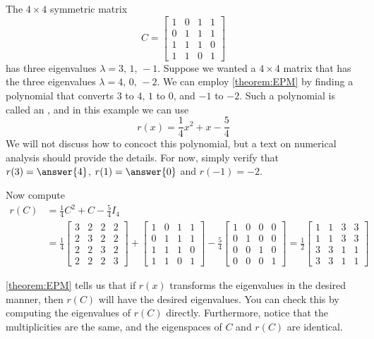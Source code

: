 \documentclass{ximera}
\begin{document}
\begin{example}

The $4\times 4$ symmetric matrix
\[
C=
\begin{bmatrix}
1 &  0 &  1 &  1\\
0 &  1 &  1 &  1\\
1 &  1 &  1 &  0\\
1 &  1 &  0 &  1
\end{bmatrix}
\]
has three eigenvalues $\lambda=3,\,1,\,-1$.  Suppose we wanted a $4\times 4$ matrix that has the three eigenvalues $\lambda=4,\,0,\,-2$.  We can employ \ref{theorem:EPM} by finding a polynomial that converts $3$ to $4$, $1$ to $0$, and $-1$ to $-2$.  Such a polynomial is called an , and in this example we can use
\[
r(x)=\frac{1}{4}x^2+x-\frac{5}{4}
\]
We will not discuss how to concoct this polynomial, but a text on
numerical analysis should provide the details.  For now, simply verify
that $r(3)=\answer{4}$, $r(1)=\answer{0}$ and $r(-1)=-2$.

Now compute
\begin{align*}
r(C)&=\frac{1}{4}C^2+C-\frac{5}{4}I_4\\
&=
\frac{1}{4}
\begin{bmatrix}
3 &  2 &  2 &  2\\
2 &  3 &  2 &  2\\
2 &  2 &  3 &  2\\
2 &  2 &  2 &  3
\end{bmatrix}
+
\begin{bmatrix}
1 &  0 &  1 &  1\\
0 &  1 &  1 &  1\\
1 &  1 &  1 &  0\\
1 &  1 &  0 &  1
\end{bmatrix}
-\frac{5}{4}
\begin{bmatrix}
1 &  0 &  0 &  0\\
0 &  1 &  0 &  0\\
0 &  0 &  1 &  0\\
0 &  0 &  0 &  1
\end{bmatrix}
=
\frac{1}{2}
\begin{bmatrix}
1 &  1 &  3 &  3\\
1 &  1 &  3 &  3\\
3 &  3 &  1 &  1\\
3 &  3 &  1 &  1
\end{bmatrix}
\end{align*}


\ref{theorem:EPM} tells us that if $r(x)$ transforms the eigenvalues in the desired manner, then $r(C)$ will have the desired eigenvalues.  You can check this by computing the eigenvalues of $r(C)$ directly.  Furthermore, notice that the multiplicities are the same, and the eigenspaces of $C$ and $r(C)$ are identical.

\end{example}
\end{document}
